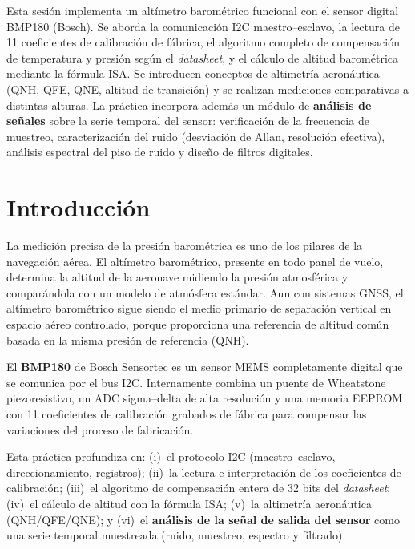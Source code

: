 \documentclass[11pt]{article}
\begin{document}
\portada

\begin{resumen}
Esta sesión implementa un altímetro barométrico funcional con el sensor digital BMP180
(Bosch). Se aborda la comunicación I2C maestro--esclavo, la lectura de 11 coeficientes de
calibración de fábrica, el algoritmo completo de compensación de temperatura y presión
según el \emph{datasheet}, y el cálculo de altitud barométrica mediante la fórmula ISA.
Se introducen conceptos de altimetría aeronáutica (QNH, QFE, QNE, altitud de transición)
y se realizan mediciones comparativas a distintas alturas. La práctica incorpora además
un módulo de \textbf{análisis de señales} sobre la serie temporal del sensor: verificación
de la frecuencia de muestreo, caracterización del ruido (desviación de Allan, resolución
efectiva), análisis espectral del piso de ruido y diseño de filtros digitales.
\end{resumen}

\tableofcontents
\newpage

\section{Introducción}

La medición precisa de la presión barométrica es uno de los pilares de la navegación
aérea. El altímetro barométrico, presente en todo panel de vuelo, determina la altitud
de la aeronave midiendo la presión atmosférica y comparándola con un modelo de atmósfera
estándar. Aun con sistemas GNSS, el altímetro barométrico sigue siendo el medio primario
de separación vertical en espacio aéreo controlado, porque proporciona una referencia de
altitud común basada en la misma presión de referencia (QNH).

El \textbf{BMP180} de Bosch Sensortec es un sensor MEMS completamente digital que se
comunica por el bus I2C. Internamente combina un puente de Wheatstone piezoresistivo, un
ADC sigma--delta de alta resolución y una memoria EEPROM con 11 coeficientes de
calibración grabados de fábrica para compensar las variaciones del proceso de fabricación.

Esta práctica profundiza en: (i)~el protocolo I2C (maestro--esclavo, direccionamiento,
registros); (ii)~la lectura e interpretación de los coeficientes de calibración;
(iii)~el algoritmo de compensación entera de 32 bits del \emph{datasheet};
(iv)~el cálculo de altitud con la fórmula ISA; (v)~la altimetría aeronáutica
(QNH/QFE/QNE); y (vi)~el \textbf{análisis de la señal de salida del sensor} como una
serie temporal muestreada (ruido, muestreo, espectro y filtrado).
\end{document}
